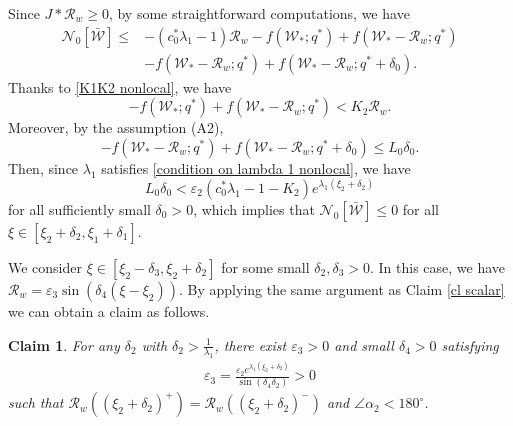 \documentclass[11pt,a4paper]{article}
\newtheorem{claim}[theorem]{\textbf{Claim}}
\numberwithin{equation}{section}
\numberwithin{figure}{section}
\newcommand\bea{\begin{eqnarray}}
\newcommand\eea{\end{eqnarray}}
\begin{document}
Since $J\ast \mathcal{R}_w\ge 0$, by some  straightforward computations, we have
\begin{equation*}
\begin{aligned}
\mathcal{N}_0[\bar{\mathcal{W}}]
\le&-(c_0^*\lambda_1-1)\mathcal{R}_w-f(\mathcal{W}_*;q^*)+f(\mathcal{W}_*-\mathcal{R}_w;q^*)\\
&-f(\mathcal{W}_*-\mathcal{R}_w;q^*)+f(\mathcal{W}_*-\mathcal{R}_w;q^*+\delta_0).
\end{aligned}
\end{equation*}
Thanks to \eqref{K1K2 nonlocal}, we have
$$-f(\mathcal{W}_*;q^*)+f(\mathcal{W}_*-\mathcal{R}_w;q^*)< K_2\mathcal{R}_w.$$
Moreover, by the assumption (A2), %
$$-f(\mathcal{W}_*-\mathcal{R}_w;q^*)+f(\mathcal{W}_*-\mathcal{R}_w;q^*+\delta_0)\le L_0\delta_0.$$
Then, %
since
$\lambda_1$ satisfies \eqref{condition on lambda 1 nonlocal}, we have
$$L_0\delta_0<\varepsilon_2(c_0^*\lambda_1-1-K_2) e^{\lambda_1(\xi_2+\delta_2)}$$
for all sufficiently small $\delta_0>0$,
which implies that $\mathcal{N}_0[\bar{\mathcal W}]\le 0$ for all $\xi\in[\xi_2+\delta_2,\xi_1+\delta_1]$.


\medskip


 We consider $\xi\in[\xi_2-\delta_3,\xi_2+\delta_2]$ for some small $\delta_2,\delta_3>0$. In this case, we have $\mathcal{R}_w=\varepsilon_3\sin(\delta_4(\xi-\xi_2))$.
By applying the same argument as Claim \ref{cl scalar} we can obtain a claim as follows.
\begin{claim}%
For any $\delta_2$ with $\delta_2>\frac{1}{\lambda_1}$, there exist
$\varepsilon_3>0$ and small $\delta_4>0$ satisfying
\bea\label{epsilon 3 nonlocal}
\varepsilon_3= \frac{\varepsilon_2e^{\lambda_1(\xi_2+\delta_2)}}{\sin(\delta_4\delta_2)}>0
\eea
such that $\mathcal{R}_w((\xi_2+\delta_2)^+)=\mathcal{R}_w((\xi_2+\delta_2)^-)$ and $\angle\alpha_2<180^{\circ}$.
\end{claim}
\end{document}
